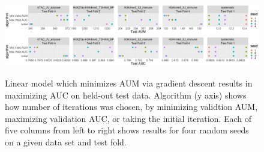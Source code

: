 \documentclass{article}
\begin{document}
\begin{figure}[t]
\vskip 0.2in
\begin{center}
\includegraphics[width=\textwidth]{figure-test-aum-comparison.png}
\includegraphics[width=\textwidth]{figure-test-auc-comparison.png}
\vskip -0.5cm
\caption{
Linear model which minimizes AUM via gradient descent results in maximizing AUC on held-out test data.
Algorithm (y axis) shows how number of iterations was chosen, by minimizing validtion AUM, maximizing validation AUC, or taking the initial iteration.
Each of five columns from left to right shows results for four random seeds on a given data set and test fold.
}
\label{fig:test-aum-comparison}
\end{center}
\vskip -0.2in
\end{figure}
\end{document}
